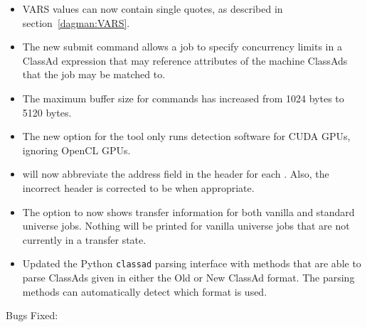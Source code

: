 \begin{itemize}
\item {} VARS values can now contain single quotes,
as described in section~\ref{dagman:VARS}.

\item 
The new submit command 
allows a job to specify concurrency limits in a ClassAd expression 
that may reference attributes of the machine ClassAds that the job
may be matched to.

\item The maximum buffer size for  commands has increased
from 1024 bytes to 5120 bytes.

\item The new  option for the  tool
only runs detection software for CUDA GPUs, 
ignoring OpenCL GPUs.

\item {} will now abbreviate the address field in the header 
for each . 
Also, the incorrect header  is corrected to be 
when appropriate.

\item The  option to  now shows transfer information for 
both vanilla and standard universe jobs.
Nothing will be printed for vanilla universe jobs that are not currently 
in a transfer state.

\item Updated the Python \texttt{classad} parsing interface with methods that
are able to parse ClassAds given in either the Old or New ClassAd format.
The parsing methods can automatically detect which format is used.

\end{itemize}

\noindent Bugs Fixed:

